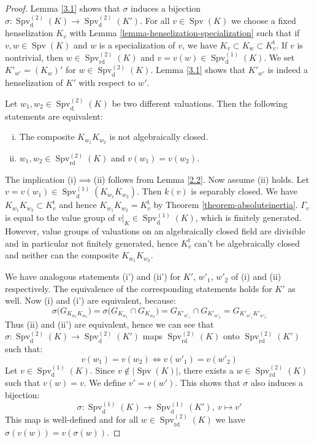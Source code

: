 \begin{proof}
Lemma \ref{3.1} shows that $\sigma$ induces a bijection $\sigma: \operatorname{Spv}_\text{d}^{(2)}(K)\to \operatorname{Spv}_\text{d}^{(2)}(K')$. For all $v\in\operatorname{Spv}(K)$ we choose a fixed henselization $K_v$ with Lemma \ref{lemma-henselization-specialization} such that if $v,w\in\operatorname{Spv}(K)$ and $w$ is a specialization of $v$, we have $K_v\subset K_w\subset K_v^\text{t}$. If $v$ is nontrivial, then $w\in\operatorname{Spv}_\text{rd}^{(2)}(K)$ and $v=v(w)\in\operatorname{Spv}_\text{d}^{(1)}(K)$. We set $K'_{w'} = (K_w)'$ for $w\in\operatorname{Spv}_\text{d}^{(2)}(K)$. Lemma \ref{3.1} shows that $K'_{w'}$ is indeed a henselization of $K'$ with respect to $w'$.

Let $w_1,w_2 \in\operatorname{Spv}_\text{d}^{(2)}(K)$ be two different valuations. Then the following statements are equivalent:
\begin{enumerate}[(i)]
\item The composite $K_{w_1}K_{w_2}$ is not algebraically closed.
\item $w_1,w_2\in\operatorname{Spv}_\text{rd}^{(2)}(K)$ and $v(w_1) = v(w_2)$.
\end{enumerate}
The implication (i)$\implies$(ii) follows from Lemma \ref{2.2}. Now assume (ii) holds. Let $v=v(w_1)\in \operatorname{Spv}_\text{d}^{(1)}(K_{w_1}K_{w_2})$. Then $k(v)$ is separably closed. We have $K_{w_1}K_{w_2}\subset K_v^\text{t}$ and hence $K_{w_1}K_{w_2}=K_v^\text{t}$ by Theorem \ref{theorem-absoluteinertia}. $\Gamma_v$ is equal to the value group of $v|_K\in\operatorname{Spv}_\text{d}^{(1)}(K)$, which is finitely generated. However, value groups of valuations on an algebraically closed field are divisible and in particular not finitely generated, hence $K_v^\text{t}$ can't be algebraically closed and neither can the composite $K_{w_1}K_{w_2}$.

We have analogous statements (i') and (ii') for $K'$, $w'_1$, $w'_2$ of (i) and (ii) respectively. The equivalence of the corresponding statements holds for $K'$ as well. Now (i) and (i') are equivalent, because:
\[\sigma\big(G_{K_{w_1}K_{w_2}}\big) = \sigma\big(G_{K_{w_1}}\cap G_{K_{w_2}}\big) = G_{K'_{w'_1}}\cap G_{K'_{w'_2}} = G_{K'_{w'_1}K'_{w'_2}} \]
Thus (ii) and (ii') are equivalent, hence we can see that $\sigma: \operatorname{Spv}_\text{d}^{(2)}(K)\to \operatorname{Spv}_\text{d}^{(2)}(K')$ maps $\operatorname{Spv}_\text{rd}^{(2)}(K)$ onto $\operatorname{Spv}_\text{rd}^{(2)}(K')$ such that:
\[ v(w_1)=v(w_2) \iff v(w'_1) = v(w'_2) \]
Let $v\in\operatorname{Spv}_\text{d}^{(1)}(K)$. Since $v\not\in |\operatorname{Spv}(K)|$, there exists a $w\in\operatorname{Spv}_\text{rd}^{(2)}(K)$ such that $v(w)=v$. We define $v'=v(w')$. This shows that $\sigma$ also induces a bijection: 
\[\sigma:\operatorname{Spv}_\text{d}^{(1)}(K)\to\operatorname{Spv}_\text{d}^{(1)}(K'),\ v\mapsto v'\] 
This map is well-defined and for all $w\in\operatorname{Spv}_\text{rd}^{(2)}(K)$ we have $\sigma(v(w)) = v(\sigma(w))$.


\end{proof}
